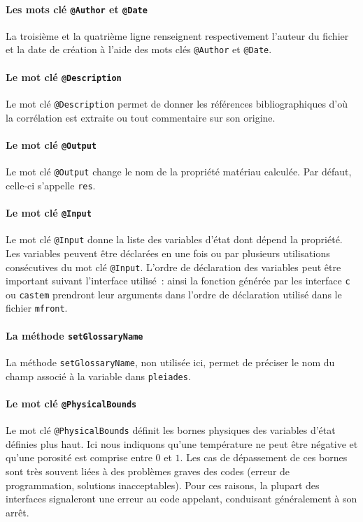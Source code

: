 \documentclass[12pt]{article}
\newcommand{\pleiades}{\texttt{pleiades}}
\newcommand{\mfront}{\texttt{mfront}}
\begin{document}
\paragraph{Les mots clé \texttt{@Author} et \texttt{@Date}} La
troisième et la quatrième ligne renseignent respectivement l'auteur du
fichier et la date de création à l'aide des mots clés \texttt{@Author}
et \texttt{@Date}.

\paragraph{Le mot clé \texttt{@Description}} Le mot clé
\texttt{@Description} permet de donner les références bibliographiques
d'où la corrélation est extraite ou tout commentaire sur son origine.

\paragraph{Le mot clé \texttt{@Output}} Le mot clé \texttt{@Output}
change le nom de la propriété matériau calculée. Par défaut, celle-ci
s'appelle \texttt{res}.

\paragraph{Le mot clé \texttt{@Input}} Le mot clé \texttt{@Input}
donne la liste des variables d'état dont dépend la propriété. Les
variables peuvent être déclarées en une fois ou par plusieurs
utilisations consécutives du mot clé \texttt{@Input}. L'ordre de
déclaration des variables peut être important suivant l'interface
utilisé~: ainsi la fonction générée par les interface \texttt{c} ou
\texttt{castem} prendront leur arguments dans l'ordre de déclaration
utilisé dans le fichier \mfront{}.

\paragraph{La méthode \texttt{setGlossaryName}} La méthode
\texttt{setGlossaryName}, non utilisée ici, permet de préciser le nom
du champ associé à la variable dans \pleiades{}.

\paragraph{Le mot clé \texttt{@PhysicalBounds}} Le mot clé
\texttt{@PhysicalBounds} définit les bornes physiques des variables
d'état définies plus haut. Ici nous indiquons qu'une température ne
peut être négative et qu'une porosité est comprise entre \(0\) et
\(1\). Les cas de dépassement de ces bornes sont très souvent liées à
des problèmes graves des codes (erreur de programmation, solutions
inacceptables). Pour ces raisons, la plupart des interfaces
signaleront une erreur au code appelant, conduisant généralement à son
arrêt.
\end{document}
